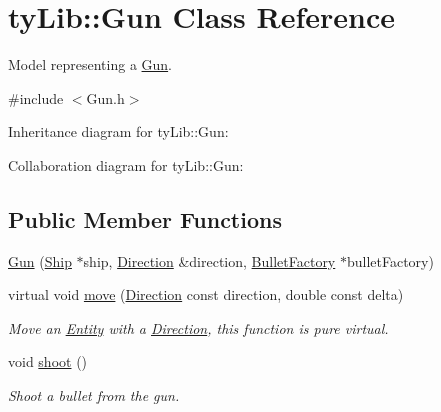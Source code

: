 \hypertarget{classty_lib_1_1_gun}{}\section{ty\+Lib\+:\+:Gun Class Reference}
\label{classty_lib_1_1_gun}


Model representing a \hyperlink{classty_lib_1_1_gun}{Gun}.  




{\ttfamily \#include $<$Gun.\+h$>$}



Inheritance diagram for ty\+Lib\+:\+:Gun\+:


Collaboration diagram for ty\+Lib\+:\+:Gun\+:
\subsection*{Public Member Functions}
\begin{DoxyCompactItemize}
\item 
\hyperlink{classty_lib_1_1_gun_a2b05ac8f0a2c8501df42c7dae9bce093}{Gun} (\hyperlink{classty_lib_1_1_ship}{Ship} $\ast$ship, \hyperlink{classty_lib_1_1_direction}{Direction} \&direction, \hyperlink{classty_lib_1_1_bullet_factory}{Bullet\+Factory} $\ast$bullet\+Factory)
\item 
\hypertarget{classty_lib_1_1_gun_ad1ce7e4d7e955e6b2ae1662a37480015}{}virtual void \hyperlink{classty_lib_1_1_gun_ad1ce7e4d7e955e6b2ae1662a37480015}{move} (\hyperlink{classty_lib_1_1_direction}{Direction} const direction, double const delta)\label{classty_lib_1_1_gun_ad1ce7e4d7e955e6b2ae1662a37480015}

\begin{DoxyCompactList}\small\item\em Move an \hyperlink{classty_lib_1_1_entity}{Entity} with a \hyperlink{classty_lib_1_1_direction}{Direction}, this function is pure virtual. \end{DoxyCompactList}\item 
\hypertarget{classty_lib_1_1_gun_a087be97ce499be4b60939b6b1ce1a8da}{}void \hyperlink{classty_lib_1_1_gun_a087be97ce499be4b60939b6b1ce1a8da}{shoot} ()\label{classty_lib_1_1_gun_a087be97ce499be4b60939b6b1ce1a8da}

\begin{DoxyCompactList}\small\item\em Shoot a bullet from the gun. \end{DoxyCompactList}\end{DoxyCompactItemize}
